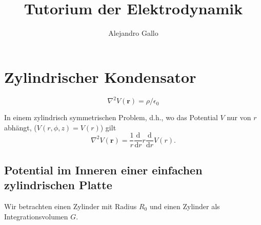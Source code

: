 \documentclass[A4paper, 12pt]{amsart}
\title{Tutorium der Elektrodynamik}
\author{Alejandro Gallo}
\begin{document}
\maketitle

\section{Zylindrischer Kondensator}

%
\begin{equation}
  \label{eq:gauss_theorem}
  \nabla ^{2} V(\mathbf{r}) = \rho / \epsilon_{0}
\end{equation}
%

In einem zylindrisch symmetrischen Problem, d.h., wo das Potential
$ V $ nur von $ r $ abhängt, ($ V(r, \phi, z) = V(r) $) gilt
%
\begin{equation}
  \label{eq:laplacian_in_cylindrical_coordinates}
  \nabla ^{2} V(\mathbf{r}) =
  \frac{1}{r}
  \frac{\mathrm{d}}{\mathrm{d}r}
  r
  \frac{\mathrm{d}}{\mathrm{d}r}
  V(r)
  .
\end{equation}
%

\subsection{Potential im Inneren einer einfachen zylindrischen Platte}

Wir betrachten einen Zylinder mit Radius $ R_{0} $ und einen
Zylinder als Integrationsvolumen $ G $.

\begin{center}
  
\end{center}
\end{document}
